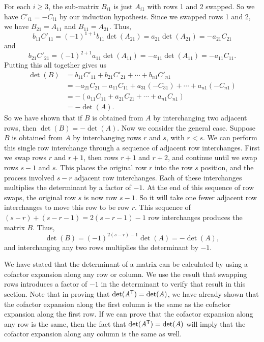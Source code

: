 For each $i \geq 3$, the sub-matrix $B_{i1}$ is just $A_{i1}$ with rows 1 and 2 swapped. So we have $C'_{i1} = -C_{i1}$ by our induction hypothesis. Since we swapped rows 1 and 2, we have $B_{21} = A_{11}$ and $B_{11} = A_{21}$. Thus,
\[b_{11}C'_{11} = (-1)^{1+1}b_{11}\det(A_{21}) = a_{21}\det(A_{21}) = -a_{21}C_{21}\]
and
\[b_{21}C'_{21} = (-1)^{2+1}a_{11}\det(A_{11}) = -a_{11}\det(A_{11}) = -a_{11}C_{11}.\]
Putting this all together gives us
\begin{align*}
\det(B) &= b_{11}C'_{11} + b_{21}C'_{21} + \cdots + b_{n1}C'_{n1} \\
	&= -a_{21}C_{21} - a_{11}C_{11} + a_{31}(-C_{31}) + \cdots + a_{n1}(-C_{n1}) \\
	&= -\left(a_{11}C_{11} + a_{21}C_{21} + \cdots + a_{n1}C_{n1}\right) \\
	&= - \det(A).
\end{align*}
So we have shown that if $B$ is obtained from $A$ by interchanging two adjacent rows, then $\det(B) = -\det(A)$. Now we consider the general case. Suppose $B$ is obtained from $A$ by interchanging rows $r$ and $s$, with $r < s$. We can perform this single row interchange through a sequence of adjacent row interchanges. First we swap rows $r$ and $r+1$, then rows $r+1$ and $r+2$, and continue until we swap rows $s-1$ and $s$. This places the original row $r$ into the row $s$ position, and the process involved $s-r$ adjacent row interchanges. Each of these interchanges multiplies the determinant by a factor of $-1$. At the end of this sequence of row swaps, the original row $s$ is now row $s-1$. So it will take one fewer adjacent row interchanges to move this row to be row $r$. This sequence of $(s-r)+(s-r-1) = 2(s-r-1)-1$ row interchanges produces the matrix $B$. Thus,
\[\det(B) = (-1)^{2(s-r)-1}\det(A) = -\det(A),\]
and interchanging any two rows multiplies the determinant by $-1$. 




We have stated that the determinant of a matrix can be calculated by using a cofactor expansion along any row or column. We use the result that swapping rows introduces a factor of $-1$ in the determinant to verify that result in this section. Note that in proving that $\det(A^{\mathsf{T}}) = \det(A)$, we have already shown that the cofactor expansion along the first column is the same as the cofactor expansion along the first row. If we can prove that the cofactor expansion along any row is the same, then the fact that $\det(A^{\mathsf{T}}) = \det(A)$ will imply that the cofactor expansion along any column is the same as well.

